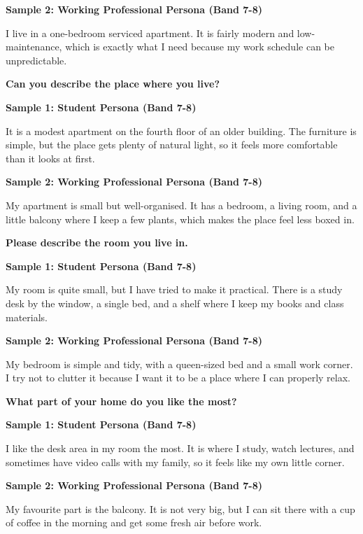 \textbf{Sample 2: Working Professional Persona (Band 7-8)}

I live in a one-bedroom serviced apartment. It is fairly modern and low-maintenance, which is exactly what I need because my work schedule can be unpredictable.

\separator

\begin{ieltsquestion}
\textbf{Can you describe the place where you live?}
\end{ieltsquestion}
\textbf{Sample 1: Student Persona (Band 7-8)}

It is a modest apartment on the fourth floor of an older building. The furniture is simple, but the place gets plenty of natural light, so it feels more comfortable than it looks at first.

\textbf{Sample 2: Working Professional Persona (Band 7-8)}

My apartment is small but well-organised. It has a bedroom, a living room, and a little balcony where I keep a few plants, which makes the place feel less boxed in.

\separator

\begin{ieltsquestion}
\textbf{Please describe the room you live in.}
\end{ieltsquestion}
\textbf{Sample 1: Student Persona (Band 7-8)}

My room is quite small, but I have tried to make it practical. There is a study desk by the window, a single bed, and a shelf where I keep my books and class materials.

\textbf{Sample 2: Working Professional Persona (Band 7-8)}

My bedroom is simple and tidy, with a queen-sized bed and a small work corner. I try not to clutter it because I want it to be a place where I can properly relax.

\separator

\begin{ieltsquestion}
\textbf{What part of your home do you like the most?}
\end{ieltsquestion}
\textbf{Sample 1: Student Persona (Band 7-8)}

I like the desk area in my room the most. It is where I study, watch lectures, and sometimes have video calls with my family, so it feels like my own little corner.

\textbf{Sample 2: Working Professional Persona (Band 7-8)}

My favourite part is the balcony. It is not very big, but I can sit there with a cup of coffee in the morning and get some fresh air before work.

